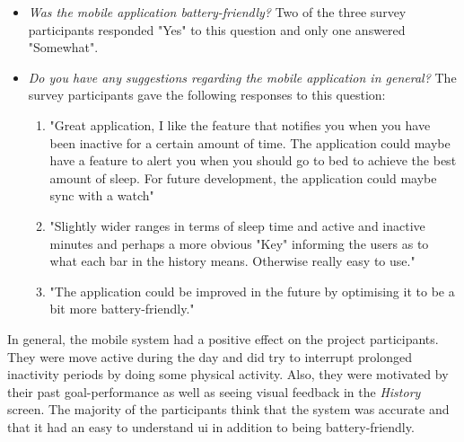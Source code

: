 \begin{itemize}
    \item \textit{Was the mobile application battery-friendly?}  Two of the three survey participants responded "Yes" to this question and only one answered "Somewhat".
    \item \textit{Do you have any suggestions regarding the mobile application in general?} The survey participants gave the following responses to this question: 
    \begin{enumerate}
        \item "Great application, I like the feature that notifies you when you have been inactive for a certain amount of time. The application could maybe have a feature to alert you when you should go to bed to achieve the best amount of sleep. For future development, the application could maybe sync with a watch"
        \item "Slightly wider ranges in terms of sleep time and active and inactive minutes and perhaps a more obvious "Key" informing the users as to what each bar in the history means. Otherwise really easy to use."
        \item "The application could be improved in the future by optimising it to be a bit more battery-friendly."
    \end{enumerate}
\end{itemize}

In general, the mobile system had a positive effect on the project participants. They were move active during the day and did try to interrupt prolonged inactivity periods by doing some physical activity. Also, they were motivated by their past goal-performance as well as seeing visual feedback in the \textit{History} screen. The majority of the participants think that the system was accurate and that it had an easy to understand \gls{ui} in addition to being battery-friendly. 

